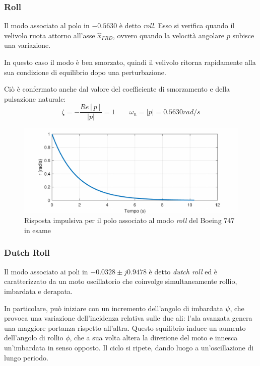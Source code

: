 \subsubsection{Roll}

Il modo associato al polo in $-0.5630$ è detto \textit{roll}. Esso si verifica quando il velivolo ruota attorno all'asse $\hat{x}_{FRD}$, ovvero quando la velocità angolare $p$ subisce una variazione.

In questo caso il modo è ben smorzato, quindi il velivolo ritorna rapidamente alla sua condizione di equilibrio dopo una perturbazione.

Ciò è confermato anche dal valore del coefficiente di smorzamento e della pulsazione naturale:
\begin{equation*}
    \zeta = - \frac{Re[p]}{\left|p\right|} = 1 \qquad \omega_n = \left|p\right| = 0.5630rad/s
\end{equation*}

\begin{figure}[H]
    \centering
    \includegraphics[width=0.7\linewidth]{Immagini/roll_mode.pdf}
    \caption{Risposta impulsiva per il polo associato al modo \textit{roll} del Boeing 747 in esame}
\end{figure}

\subsubsection{Dutch Roll}

Il modo associato ai poli in $-0.0328 \pm j0.9478$ è detto \textit{dutch roll} ed è caratterizzato da un moto oscillatorio che coinvolge simultaneamente rollio, imbardata e derapata.

In particolare, può iniziare con un incremento dell'angolo di imbardata $\psi$, che provoca una variazione dell'incidenza relativa sulle due ali: l'ala avanzata genera una maggiore portanza rispetto all'altra.
Questo squilibrio induce un aumento dell'angolo di rollio $\phi$, che a sua volta altera la direzione del moto e innesca un'imbardata in senso opposto.
Il ciclo si ripete, dando luogo a un'oscillazione di lungo periodo.


